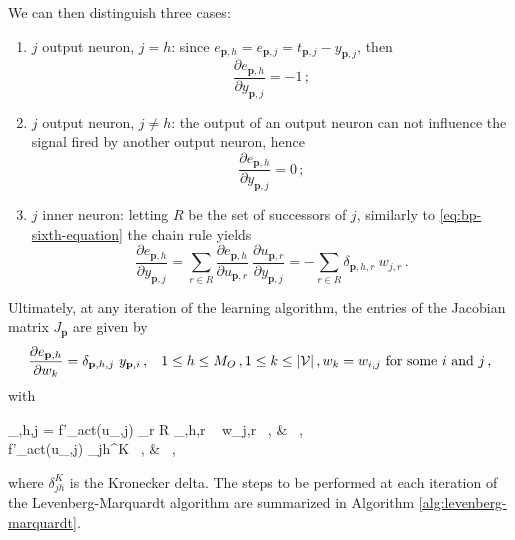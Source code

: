 \documentclass[12pt, a4paper, twoside, openright, notitlepage]{report}
\numberwithin{equation}{chapter}
\theoremstyle{theorem}
\theoremstyle{definition}
\theoremstyle{remark}
\theoremstyle{proposition}
\numberwithin{figure}{chapter}
\begin{document}
		We can then distinguish three cases:
		\begin{enumerate}[label=(\roman*)]
			\item $j$ output neuron, $j = h$: since $e_{\mathbf{p},h} = e_{\mathbf{p},j} = t_{\mathbf{p},j} - y_{\mathbf{p},j}$, then 
			\begin{equation*}
				\label{eq:jacobian-first-case}
				\dfrac{\partial e_{\mathbf{p},h}}{\partial y_{\mathbf{p},j}} = -1 \, ;
			\end{equation*}
			\item $j$ output neuron, $j \neq h$: the output of an output neuron can not influence the signal fired by another output neuron, hence 
			\begin{equation*}
				\label{eq:jacobian-second-case}
				\dfrac{\partial e_{\mathbf{p},h}}{\partial y_{\mathbf{p},j}} = 0 \, ;
			\end{equation*}
			\item $j$ inner neuron: letting $R$ be the set of successors of $j$, similarly to \eqref{eq:bp-sixth-equation} the chain rule yields
			\begin{equation*}
				\label{eq:jacobian-third-case}
				\dfrac{\partial e_{\mathbf{p},h}}{\partial y_{\mathbf{p},j}} = \sum_{r \in R} \dfrac{\partial e_{\mathbf{p},h}}{\partial u_{\mathbf{p},r}} ~ \dfrac{\partial u_{\mathbf{p},r}}{\partial y_{\mathbf{p},j}} = - \sum_{r \in R} \delta_{\mathbf{p},h,r} ~ w_{j,r} \, .
			\end{equation*}
		\end{enumerate}
		Ultimately, at any iteration of the learning algorithm, the entries of the Jacobian matrix $J_{\mathbf{p}}$ are given by
		\begin{equation*}
			\dfrac{\partial e_{\mathbf{p},h}}{\partial w_k} = \delta_{\mathbf{p},h,j} ~ y_{\mathbf{p},i} \, , \hspace*{0.3cm} 1 \leq h \leq M_O \, , 1 \leq k \leq |\mathcal{V}| \, , \text{$w_k = w_{i,j}$ for some $i$ and $j$} \, ,
		\end{equation*}
		with
		\begin{subnumcases}{\delta_{,h,j} =}
			\label{eq:levenberg-marquardt-inner-neuron}
		   	f'_{act}(u_{,j}) \sum_{r \in R} \delta_{,h,r} ~ w_{j,r} \, , &  \, , \\
		   	\label{eq:levenberg-marquardt-output-neuron}
			f'_{act}(u_{,j}) \delta_{jh}^K \, , &  \, ,
		\end{subnumcases}
		where $\delta_{jh}^K$ is the Kronecker delta. The steps to be performed at each iteration of the Levenberg-Marquardt algorithm are summarized in Algorithm \ref{alg:levenberg-marquardt}.
		
\end{document}
